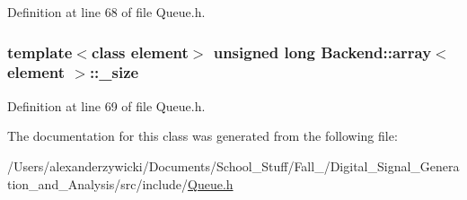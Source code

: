 Definition at line 68 of file Queue.\+h.

\hypertarget{classBackend_1_1array_ae51d64e87b42931946111c28b98e8a18}{
\subsubsection[{\+\_\+size}]{\setlength{\rightskip}{0pt plus 5cm}template$<$class element$>$ unsigned long {\bf Backend\+::array}$<$ element $>$\+::\+\_\+size\hspace{0.3cm}{\ttfamily [protected]}}}\label{classBackend_1_1array_ae51d64e87b42931946111c28b98e8a18}


Definition at line 69 of file Queue.\+h.



The documentation for this class was generated from the following file\+:\begin{DoxyCompactItemize}
\item 
/\+Users/alexanderzywicki/\+Documents/\+School\+\_\+\+Stuff/\+Fall\+\_/\+Digital\+\_\+\+Signal\+\_\+\+Generation\+\_\+and\+\_\+\+Analysis/src/include/\hyperlink{Queue_8h}{Queue.\+h}\end{DoxyCompactItemize}
